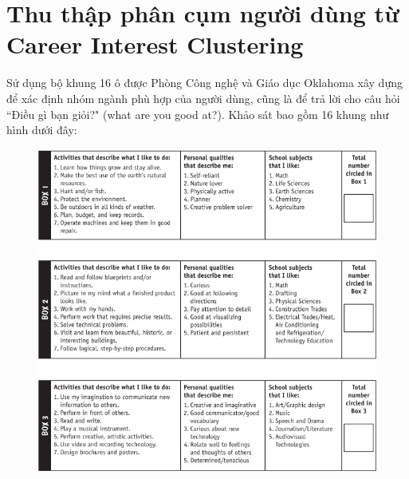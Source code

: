\section{Thu thập phân cụm người dùng từ Career Interest Clustering} \label{3.3}
Sử dụng bộ khung 16 ô được Phòng Công nghệ và Giáo dục Oklahoma xây dựng để xác định nhóm ngành phù hợp của người dùng, cũng là để trả lời cho câu hỏi ``Điều gì bạn giỏi?" (what are you good at?). Khảo sát bao gồm 16 khung như hình dưới đây:
\begin{figure}[H]
    \centering
    \includegraphics[width=0.9\linewidth,height=0.6\textheight]{images/CC1.png}
\end{figure}


